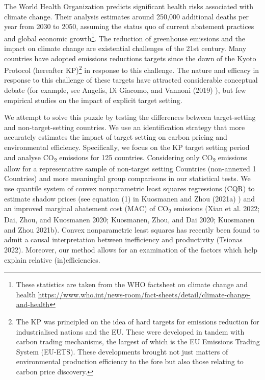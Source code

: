 \documentclass[
]{article}\usepackage{amsmath,amssymb}
\begin{document}
The World Health Organization predicts significant health risks
associated with climate change. Their analysis estimates around 250,000
additional deaths per year from 2030 to 2050, assuming the status quo of
current abatement practices and global economic growth\footnote{These
  statistics are taken from the WHO factsheet on climate change and
  health
  \url{https://www.who.int/news-room/fact-sheets/detail/climate-change-and-health}}.
The reduction of greenhouse emissions and the impact on climate change
are existential challenges of the 21st century. Many countries have
adopted emissions reductions targets since the dawn of the Kyoto
Protocol (hereafter KP)\footnote{The KP was principled on the idea of
  hard targets for emissions reduction for industrialised nations and
  the EU. These were developed in tandem with carbon trading mechanisms,
  the largest of which is the EU Emissions Trading System (EU-ETS).
  These developments brought not just matters of environmental
  production efficiency to the fore but also those relating to carbon
  price discovery.} in response to this challenge. The nature and
efficacy in response to this challenge of these targets have attracted
considerable conceptual debate (for example, see Angelis, Di Giacomo,
and Vannoni (2019) ), but few empirical studies on the impact of
explicit target setting.

We attempt to solve this puzzle by testing the differences between
target-setting and non-target-setting countries. We use an
identification strategy that more accurately estimates the impact of
target setting on carbon pricing and environmental efficiency.
Specifically, we focus on the KP target setting period and analyse
CO\textsubscript{2} emissions for 125 countries. Considering only
CO\textsubscript{2} emissions allow for a representative sample of
non-target setting Countries (non-annexed 1 Countries) and more
meaningful group comparisons in our statistical tests. We use quantile
system of convex nonparametric least squares regressions (CQR) to
estimate shadow prices (see equation (1) in Kuosmanen and Zhou (2021a) )
and an improved marginal abatement cost (MAC) of CO\textsubscript{2}
emissions (Xian et al. 2022; Dai, Zhou, and Kuosmanen 2020; Kuosmanen,
Zhou, and Dai 2020; Kuosmanen and Zhou 2021b). Convex nonparametric
least squares has recently been found to admit a causal interpretation
between inefficiency and productivity (Tsionas 2022). Moreover, our
method allows for an examination of the factors which help explain
relative (in)efficiencies.
\end{document}

